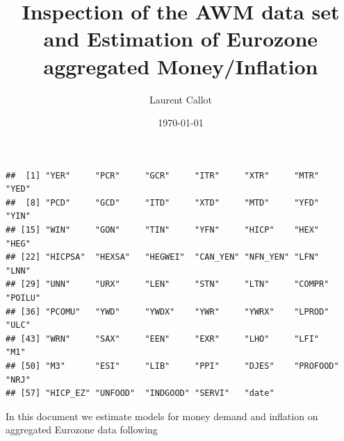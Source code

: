 \documentclass[11pt,oneside, a4paper]{amsart}\usepackage[]{graphicx}\usepackage[]{color}
\makeatletter
\newenvironment{kframe}{%
 \def\at@end@of@kframe{}%
 \ifinner\ifhmode%
  \def\at@end@of@kframe{\end{minipage}}%
  \begin{minipage}{\columnwidth}%
 \fi\fi%
 \def\FrameCommand##1{\hskip\@totalleftmargin \hskip-\fboxsep
 \colorbox{shadecolor}{##1}\hskip-\fboxsep
     \hskip-\linewidth \hskip-\@totalleftmargin \hskip\columnwidth}%
 \MakeFramed {\advance\hsize-\width
   \@totalleftmargin\z@ \linewidth\hsize
   \@setminipage}}%
 {\par\unskip\endMakeFramed%
 \at@end@of@kframe}
\newenvironment{knitrout}{}{} %
\makeatother
\begin{document}
	
\title{Inspection of the AWM data set and Estimation of Eurozone aggregated Money/Inflation }   
\author{Laurent Callot}
\date{\today}
\maketitle

\begin{knitrout}
\color{fgcolor}\begin{kframe}


{\ttfamily\noindent\itshape\color{messagecolor}{\#\# Loading required package: ggplot2\\\#\# \\\#\# Attaching package: 'dplyr'\\\#\# \\\#\# The following object is masked from 'package:stats':\\\#\# \\\#\#\ \ \ \  filter\\\#\# \\\#\# The following objects are masked from 'package:base':\\\#\# \\\#\#\ \ \ \  intersect, setdiff, setequal, union}}\end{kframe}
\end{knitrout}

\begin{knitrout}
\color{fgcolor}\begin{kframe}
\begin{verbatim}
##  [1] "YER"     "PCR"     "GCR"     "ITR"     "XTR"     "MTR"     "YED"    
##  [8] "PCD"     "GCD"     "ITD"     "XTD"     "MTD"     "YFD"     "YIN"    
## [15] "WIN"     "GON"     "TIN"     "YFN"     "HICP"    "HEX"     "HEG"    
## [22] "HICPSA"  "HEXSA"   "HEGWEI"  "CAN_YEN" "NFN_YEN" "LFN"     "LNN"    
## [29] "UNN"     "URX"     "LEN"     "STN"     "LTN"     "COMPR"   "POILU"  
## [36] "PCOMU"   "YWD"     "YWDX"    "YWR"     "YWRX"    "LPROD"   "ULC"    
## [43] "WRN"     "SAX"     "EEN"     "EXR"     "LHO"     "LFI"     "M1"     
## [50] "M3"      "ESI"     "LIB"     "PPI"     "DJES"    "PROFOOD" "NRJ"    
## [57] "HICP_EZ" "UNFOOD"  "INDGOOD" "SERVI"   "date"
\end{verbatim}
\end{kframe}
\end{knitrout}


In this document we estimate models for money demand and inflation on aggregated Eurozone data following \cite{baardsen2005econometrics}
\end{document}
